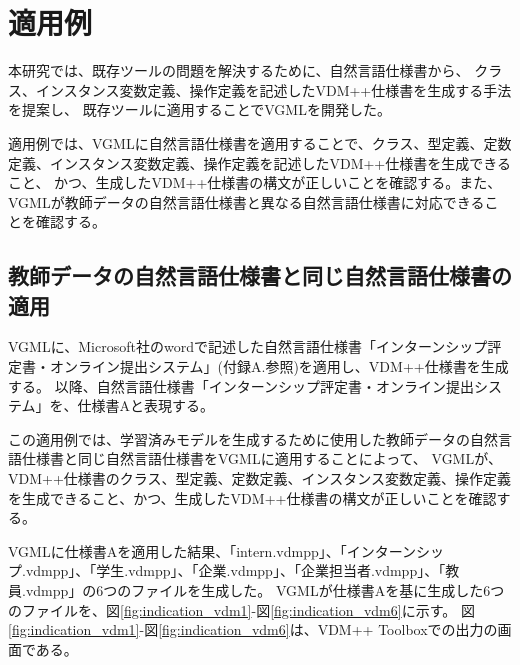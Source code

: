 \chapter{適用例}
\label{cha:Indication}

本研究では、既存ツールの問題を解決するために、自然言語仕様書から、
クラス、インスタンス変数定義、操作定義を記述したVDM++仕様書を生成する手法を提案し、
既存ツールに適用することでVGMLを開発した。

適用例では、VGMLに自然言語仕様書を適用することで、クラス、型定義、定数定義、インスタンス変数定義、操作定義を記述したVDM++仕様書を生成できること、
かつ、生成したVDM++仕様書の構文が正しいことを確認する。また、VGMLが教師データの自然言語仕様書と異なる自然言語仕様書に対応できることを確認する。

\section{教師データの自然言語仕様書と同じ自然言語仕様書の適用}
\label{sec:generate_vdm}

VGMLに、Microsoft社のwordで記述した自然言語仕様書「インターンシップ評定書・オンライン提出システム」(付録A.参照)を適用し、VDM++仕様書を生成する。
以降、自然言語仕様書「インターンシップ評定書・オンライン提出システム」を、仕様書Aと表現する。

この適用例では、学習済みモデルを生成するために使用した教師データの自然言語仕様書と同じ自然言語仕様書をVGMLに適用することによって、
VGMLが、VDM++仕様書のクラス、型定義、定数定義、インスタンス変数定義、操作定義を生成できること、かつ、生成したVDM++仕様書の構文が正しいことを確認する。

VGMLに仕様書Aを適用した結果、「intern.vdmpp」、「インターンシップ.vdmpp」、「学生.vdmpp」、「企業.vdmpp」、「企業担当者.vdmpp」、「教員.vdmpp」の6つのファイルを生成した。
VGMLが仕様書Aを基に生成した6つのファイルを、図\ref{fig:indication_vdm1}-図\ref{fig:indication_vdm6}に示す。
図\ref{fig:indication_vdm1}-図\ref{fig:indication_vdm6}は、VDM++ Toolbox\cite{Tools}での出力の画面である。

